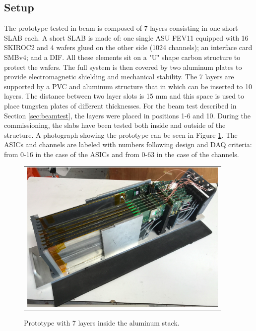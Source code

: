 \documentclass[a4paper,11pt]{article}
\begin{document}
\subsection{Setup}
\label{sec:setup}

The prototype tested in beam is composed of 7 layers consisting in one short SLAB each.
A short SLAB is made of: one single ASU FEV11 equipped with 16 SKIROC2 and 4 wafers glued on the other side (1024 channels);
an interface card SMBv4; and a DIF. All these elements sit on a "U" shape carbon structure to protect the wafers.
The full system is then covered by two aluminum plates to provide electromagnetic shielding and mechanical stability.
The 7 layers are supported by a PVC and aluminum structure that in which can be inserted to 10 layers.
The distance between two layer slots is 15 mm and this space is used to place tungsten plates of different thicknesses.
For the beam test described in Section \ref{sec:beamtest}, the layers were placed in positions 1-6 and 10.
During the commissioning, the slabs have been tested both inside and outside of the structure.
A photograph showing the prototype can be seen in Figure \ref{proto}. The ASICs and channels
are labeled with numbers following design and DAQ criteria: from 0-16 in the case of the ASICs and from 0-63 in the case of the channels.

\begin{figure}[!t]
\centering
\begin{tabular}{l}
\includegraphics[width=4.0in]{figs/proto.png} 
\end{tabular}
\caption{Prototype with 7 layers inside the aluminum stack.}
\label{proto}
\end{figure}
\end{document}
